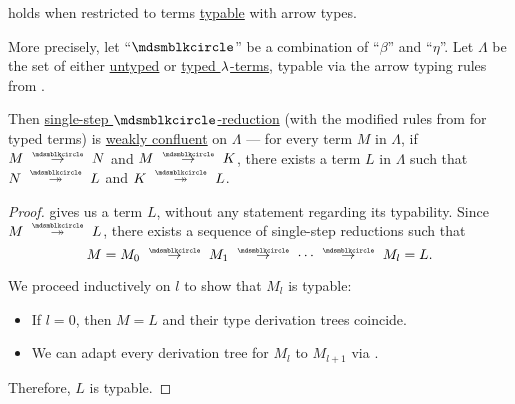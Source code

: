 \begin{proposition}\label{thm:simply_typed_church_rosser_theorem}
   holds when restricted to terms \hyperref[def:typability]{typable} with arrow types.

  More precisely, let \enquote{\( {\Anon} \)} be a combination of \enquote{\( \beta \)} and \enquote{\( \eta \)}. Let \( \Lambda \) be the set of either \hyperref[def:lambda_term]{untyped} or \hyperref[def:typed_lambda_term]{typed \( {\mathrm \lambda} \)-terms}, typable via the arrow typing rules from .

  Then \hyperref[def:lambda_term_reduction/single]{single-step \( \Anon \)-reduction} (with the modified rules from  for typed terms) is \hyperref[def:reduction_confluence]{weakly confluent} on \( \Lambda \) --- for every term \( M \) in \( \Lambda \), if \( M \pred N \) and \( M \pred K \), there exists a term \( L \) in \( \Lambda \) such that \( N \pred* L \) and \( K \pred* L \).
\end{proposition}
\begin{proof}
   gives us a term \( L \), without any statement regarding its typability. Since \( M \pred* L \), there exists a sequence of single-step reductions such that
  \begin{equation*}
    M = M_0 \pred M_1 \pred \cdots \pred M_l = L.
  \end{equation*}

  We proceed inductively on \( l \) to show that \( M_l \) is typable:
  \begin{itemize}
    \item If \( l = 0 \), then \( M = L \) and their type derivation trees coincide.
    \item We can adapt every derivation tree for \( M_l \) to \( M_{l+1} \) via .
  \end{itemize}

  Therefore, \( L \) is typable.
\end{proof}
